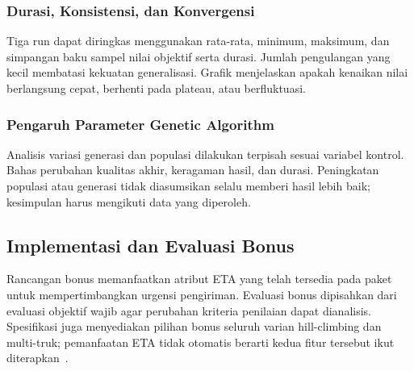 \subsubsection{Durasi, Konsistensi, dan Konvergensi}
Tiga run dapat diringkas menggunakan rata-rata, minimum, maksimum, dan
simpangan baku sampel nilai objektif serta durasi. Jumlah pengulangan yang
kecil membatasi kekuatan generalisasi. Grafik menjelaskan apakah kenaikan
nilai berlangsung cepat, berhenti pada plateau, atau berfluktuasi.


\subsubsection{Pengaruh Parameter Genetic Algorithm}
Analisis variasi generasi dan populasi dilakukan terpisah sesuai variabel
kontrol. Bahas perubahan kualitas akhir, keragaman hasil, dan durasi.
Peningkatan populasi atau generasi tidak diasumsikan selalu memberi hasil
lebih baik; kesimpulan harus mengikuti data yang diperoleh.


\subsection{Implementasi dan Evaluasi Bonus}
Rancangan bonus memanfaatkan atribut ETA yang telah tersedia pada paket
untuk mempertimbangkan urgensi pengiriman. Evaluasi bonus dipisahkan dari
evaluasi objektif wajib agar perubahan kriteria penilaian dapat dianalisis.
Spesifikasi juga menyediakan pilihan bonus seluruh varian hill-climbing dan
multi-truk; pemanfaatan ETA tidak otomatis berarti kedua fitur tersebut
ikut diterapkan~\cite{spesifikasi}.
